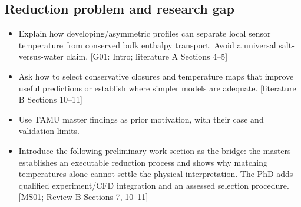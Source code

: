 \subsection{Reduction problem and research gap}
\begin{itemize}[leftmargin=*]
\item Explain how developing/asymmetric profiles can separate local sensor temperature from conserved bulk enthalpy transport. Avoid a universal salt-versus-water claim. [G01: Intro; literature A Sections 4--5]
\item Ask how to select conservative closures and temperature maps that improve useful predictions or establish where simpler models are adequate. [literature B Sections 10--11]
\item Use TAMU master findings as prior motivation, with their case and validation limits.\cite{fierro2026cfdoneD,reis2024molten}
\item Introduce the following preliminary-work section as the bridge: the master\textquotesingle{}s establishes an executable reduction process and shows why matching temperatures alone cannot settle the physical interpretation. The PhD adds qualified experiment/CFD integration and an assessed selection procedure. [MS01; Review B Sections 7, 10--11]
\end{itemize}
